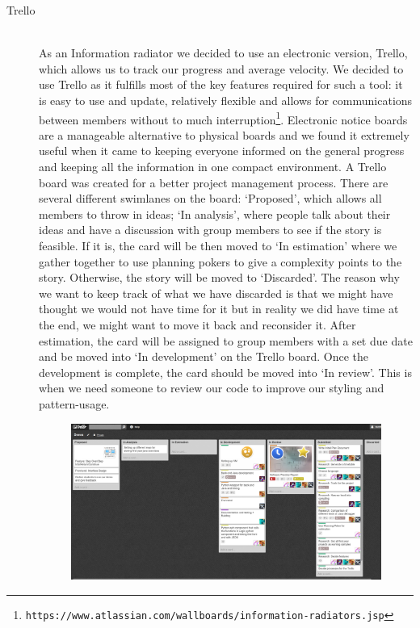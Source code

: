 \documentclass[11pt]{article}
\begin{document}
\begin{description}
  \item[Trello] \hfill \\
  As an Information radiator we decided to use an electronic version, Trello, which allows us to track our progress and average velocity. We decided to use Trello as it fulfills most of the key features required for such a tool: it is easy to use and update, relatively flexible and allows for communications between members without to much interruption\footnote{\tt{https://www.atlassian.com/wallboards/information-radiators.jsp}}. Electronic notice boards are a manageable alternative to physical boards and we found it extremely useful when it came to keeping everyone informed on the general progress and keeping all the information in one compact environment.  A Trello board was created for a better project management process. There are several different swimlanes on the board: ‘Proposed’, which allows all members to throw in ideas; ‘In analysis’, where people talk about their ideas and have a discussion with group members to see if the story is feasible. If it is, the card will be then moved to ‘In estimation’ where we gather together to use planning pokers to give a complexity points to the story. Otherwise, the story will be moved to ‘Discarded’. The reason why we want to keep track of what we have discarded is that we might have thought we would not have time for it but in reality we did have time at the end, we might want to move it back and reconsider it. After estimation, the card will be assigned to group members with a set due date and be moved into ‘In development’ on the Trello board. Once the development is complete, the card should be moved into ‘In review’. This is when we need someone to review our code to improve our styling and pattern-usage.  
\begin{figure}[h!]
\centering
\includegraphics[width=\textwidth]{Trello.png}

\end{figure}
\end{description}
\end{document}
